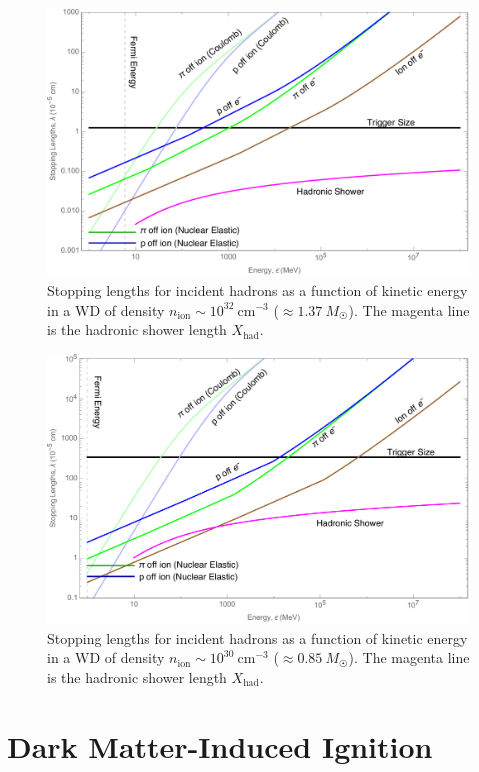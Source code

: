 \documentclass[twocolumn, preprintnumbers,amsmath,amssymb,prd, superscriptaddress]{revtex4}
\begin{document}
\begin{figure}
\includegraphics[scale=.3]{SPhighHad.pdf}
\caption{Stopping lengths for incident hadrons as a function of kinetic energy in a WD of density $n_\text{ion} \sim 10^{32}~\text{cm}^{-3}$ ($\approx 1.37 ~M_{\astrosun}$). 
The magenta line is the hadronic shower length $X_\text{had}$.}
\label{fig:SPhighHad}
\end{figure}

\begin{figure}
\includegraphics[scale=.3]{SPlowHad.pdf}
\caption{Stopping lengths for incident hadrons as a function of kinetic energy in a WD of density $n_\text{ion} \sim 10^{30}~\text{cm}^{-3}$ ($\approx 0.85 ~M_{\astrosun}$).
The magenta line is the hadronic shower length $X_\text{had}$.}
\label{fig:SPlowHad}
\end{figure}

\section{Dark Matter-Induced Ignition}
\label{sec:dmignition}

\end{document}
